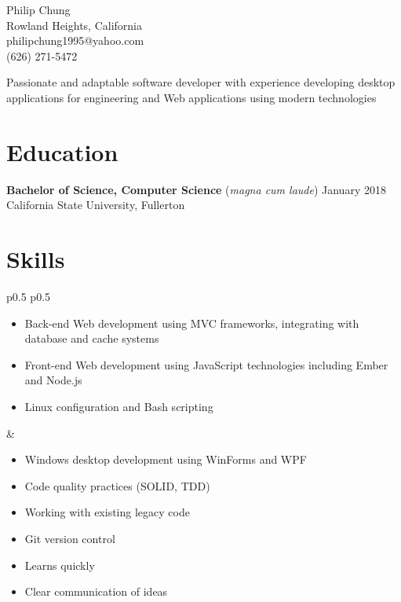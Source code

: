 \documentclass[10pt]{article}
\newcommand{\baseheader}[3]{#1 \hfill #2 \\ #3}
\begin{document}
	\begin{center}
		{\LARGE Philip Chung} \\
		Rowland Heights, California \\
		philipchung1995@yahoo.com \\
		(626) 271-5472 \\
	\end{center}

	Passionate and adaptable software developer with experience developing desktop applications for engineering and Web applications using modern technologies

	\section*{Education}

	\baseheader{\textbf{Bachelor of Science, Computer Science} (\textit{magna cum laude})}{January 2018}{California State University, Fullerton}

	\section*{Skills}

	\begin{tabular}{p{0.5\textwidth} p{0.5\textwidth}}
		\begin{minipage}[t]{\linewidth}
			\raggedright
			\begin{itemize}[nosep]
				\item Back-end Web development using MVC frameworks, integrating with database and cache systems
				\item Front-end Web development using JavaScript technologies including Ember and Node.js
				\item Linux configuration and Bash scripting
			\end{itemize}
		\end{minipage}
		&
		\begin{minipage}[t]{\linewidth}
			\raggedright
			\begin{itemize}[nosep]
				\item Windows desktop development using WinForms and WPF
				\item Code quality practices (SOLID, TDD)
				\item Working with existing legacy code
				\item Git version control
				\item Learns quickly
				\item Clear communication of ideas
			\end{itemize}
		\end{minipage}
	\end{tabular}
\end{document}
